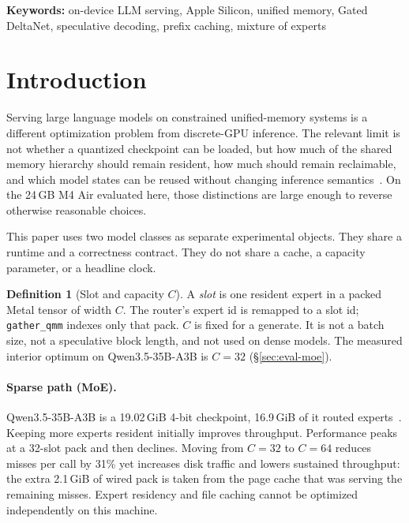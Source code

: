 \documentclass[11pt]{article}
\theoremstyle{definition}
\newtheorem{definition}{Definition}
\begin{document}
\vspace{0.4em}
\noindent\textbf{Keywords:} on-device LLM serving, Apple Silicon, unified memory, Gated DeltaNet, speculative decoding, prefix caching, mixture of experts

\section{Introduction}
\label{sec:intro}

Serving large language models on constrained unified-memory systems is a different optimization problem from discrete-GPU inference. The relevant limit is not whether a quantized checkpoint can be loaded, but how much of the shared memory hierarchy should remain resident, how much should remain reclaimable, and which model states can be reused without changing inference semantics~\citep{appleum,kwon2023vllm}. On the 24\,GB M4 Air evaluated here, those distinctions are large enough to reverse otherwise reasonable choices.

This paper uses two model classes as separate experimental objects. They share a runtime and a correctness contract. They do not share a cache, a capacity parameter, or a headline clock.

\begin{definition}[Slot and capacity $C$]
A \emph{slot} is one resident expert in a packed Metal tensor of width $C$. The router’s expert id is remapped to a slot id; \texttt{gather\_qmm} indexes only that pack. $C$ is fixed for a generate. It is not a batch size, not a speculative block length, and not used on dense models. The measured interior optimum on Qwen3.5-35B-A3B is $C{=}32$ (\S\ref{sec:eval-moe}).
\end{definition}

\paragraph{Sparse path (MoE).}
Qwen3.5-35B-A3B is a 19.02\,GiB 4-bit checkpoint, 16.9\,GiB of it routed experts~\citep{qwen35a3b,shazeer2017moe}. Keeping more experts resident initially improves throughput. Performance peaks at a 32-slot pack and then declines. Moving from $C{=}32$ to $C{=}64$ reduces misses per call by 31\% yet increases disk traffic and lowers sustained throughput: the extra 2.1\,GiB of wired pack is taken from the page cache that was serving the remaining misses. Expert residency and file caching cannot be optimized independently on this machine.
\end{document}
